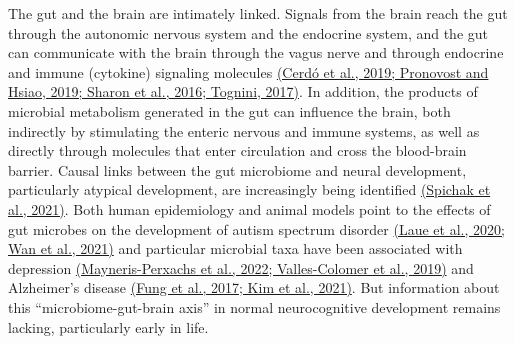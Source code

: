 \documentclass[
]{article}
\begin{document}
The gut and the brain are intimately linked. Signals from the brain
reach the gut through the autonomic nervous system and the endocrine
system, and the gut can communicate with the brain through the vagus
nerve and through endocrine and immune (cytokine) signaling molecules
\href{https://www.zotero.org/google-docs/?i3SRPn}{(Cerdó et al., 2019;
Pronovost and Hsiao, 2019; Sharon et al., 2016; Tognini, 2017)}. In
addition, the products of microbial metabolism generated in the gut can
influence the brain, both indirectly by stimulating the enteric nervous
and immune systems, as well as directly through molecules that enter
circulation and cross the blood-brain barrier. Causal links between the
gut microbiome and neural development, particularly atypical
development, are increasingly being identified
\href{https://www.zotero.org/google-docs/?UsrFKB}{(Spichak et al.,
2021)}. Both human epidemiology and animal models point to the effects
of gut microbes on the development of autism spectrum disorder
\href{https://www.zotero.org/google-docs/?Y8l5A0}{(Laue et al., 2020;
Wan et al., 2021)} and particular microbial taxa have been associated
with depression
\href{https://www.zotero.org/google-docs/?mbaFE3}{(Mayneris-Perxachs et
al., 2022; Valles-Colomer et al., 2019)} and Alzheimer's disease
\href{https://www.zotero.org/google-docs/?0BEGUn}{(Fung et al., 2017;
Kim et al., 2021)}. But information about this ``microbiome-gut-brain
axis'' in normal neurocognitive development remains lacking,
particularly early in life.
\end{document}
